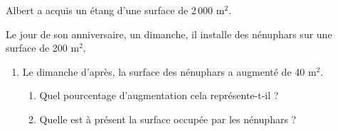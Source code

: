 \begin{minipage}[t]{0.65\textwidth}
Albert a acquis un étang d'une surface de 2\,000 m$^2$.

Le jour de son anniversaire, un dimanche, il installe des nénuphars sur une surface de 200 m$^2$.

\begin{enumerate}
\item Le dimanche d'après, la surface des nénuphars a augmenté de 40 m$^2$.
\begin{enumerate}
\item Quel pourcentage d'augmentation cela représente-t-il ?
\item Quelle est à présent la surface occupée par les nénuphars ?
\end{enumerate}
\end{enumerate}
\end{minipage}
\hfill
\begin{minipage}[t]{0.3\textwidth}
\vspace{0pt}
\begin{center}
\end{center}
\end{minipage}


